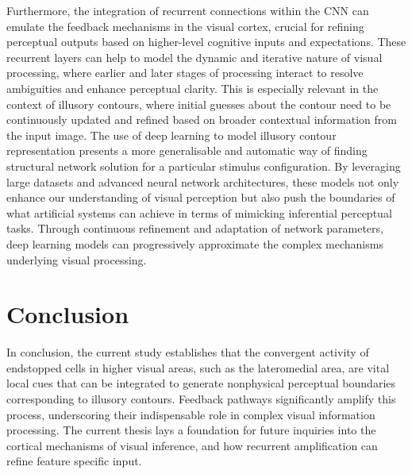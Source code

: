 \documentclass[12pt]{article}
\begin{document}
Furthermore, the integration of recurrent connections within the CNN can emulate the feedback mechanisms in the visual cortex, crucial for refining perceptual outputs based on higher-level cognitive inputs and expectations. These recurrent layers can help to model the dynamic and iterative nature of visual processing, where earlier and later stages of processing interact to resolve ambiguities and enhance perceptual clarity. This is especially relevant in the context of illusory contours, where initial guesses about the contour need to be continuously updated and refined based on broader contextual information from the input image.
\bigbreak
The use of deep learning to model illusory contour representation presents a more generalisable and automatic way of finding structural network solution for a particular stimulus configuration. By leveraging large datasets and advanced neural network architectures, these models not only enhance our understanding of visual perception but also push the boundaries of what artificial systems can achieve in terms of mimicking inferential perceptual tasks. Through continuous refinement and adaptation of network parameters, deep learning models can progressively approximate the complex mechanisms underlying visual processing.

\section*{Conclusion}
In conclusion, the current study establishes that the convergent activity of endstopped cells in higher visual areas, such as the lateromedial area, are vital  local cues that can be integrated to generate nonphysical perceptual boundaries corresponding to illusory contours. Feedback pathways significantly amplify this process, underscoring their indispensable role in complex visual information processing. The current thesis lays a foundation for future inquiries into the cortical mechanisms of visual inference, and how recurrent amplification can refine feature specific input. 

\end{document}
